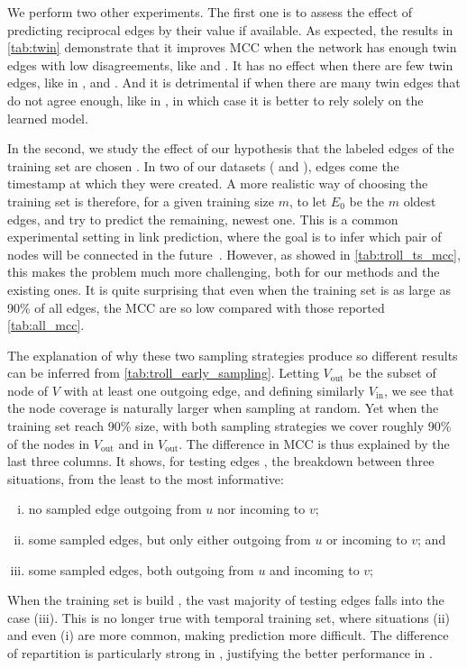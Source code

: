 

\begin{newcontent}
We perform two other experiments. The first one is to assess the effect of predicting reciprocal
edges by their value if available. As expected, the results in \autoref{tab:twin} demonstrate that
it improves MCC when the network has enough twin edges with low disagreements, like \sla{} and
\epi{}. It has no effect when there are few twin edges, like in \aut{}, \wik{} and \kiw{}. And it is
detrimental if when there are many twin edges that do  not agree enough, like in \adv{}, in which
case it is better to rely solely on the learned model.



In the second, we study the effect of our hypothesis that the labeled edges of the training set are
chosen \uar{}. In two of our datasets (\wik{} and \epi{}), edges come the timestamp at which they
were created. A more realistic way of choosing the training set is therefore, for a given training
size $m$, to let $E_0$ be the $m$ oldest edges, and try to predict the remaining, newest one. This
is a common experimental setting in link prediction, where the goal is to infer which pair of nodes
will be connected in the future~\autocite{linkPredSurvey16}. However, as showed in
\autoref{tab:troll_ts_mcc}, this makes the problem much more challenging, both for our methods and
the existing ones. It is quite surprising that even when the training set is as large as 90\% of all
edges, the MCC are so low compared with those reported \autoref{tab:all_mcc}.



The explanation of
why these two sampling strategies produce so different results can be inferred from
\autoref{tab:troll_early_sampling}. Letting $V_{\mathrm{out}}$ be the subset of node of $V$ with at
least one outgoing edge, and defining similarly $V_{\mathrm{in}}$, we see that the node coverage is
naturally larger when sampling at random. Yet when the training set reach 90\% size, with both
sampling strategies we cover roughly 90\% of the nodes in $V_{\mathrm{out}}$ and in
$V_{\mathrm{out}}$. The difference in MCC is thus explained by the last three columns. It shows, for
testing edges \euv{}, the breakdown between three situations, from the least to the most
informative:
\begin{enumerate}[(i),nosep]
  \item no sampled edge outgoing from $u$ nor incoming to $v$;
  \item some sampled edges, but only either outgoing from $u$ or incoming to $v$; and
  \item some sampled edges, both outgoing from $u$ and incoming to $v$;
\end{enumerate}
When the training set is build \uar{}, the vast majority of testing edges falls into the case (iii).
This is no longer true with temporal training set, where situations (ii) and even (i) are more
common, making prediction more difficult. The difference of repartition is particularly strong in
\wik{}, justifying the better performance in \epi{}.



\end{newcontent}

